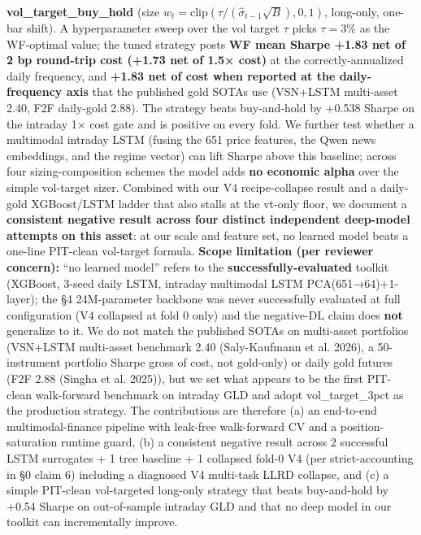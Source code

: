 \documentclass[
]{article}
\begin{document}
\textbf{vol\_target\_buy\_hold} (size \(w_t = \mathrm{clip}(\tau /
(\hat{\sigma}_{t-1}\sqrt{B}), 0, 1)\), long-only, one-bar shift). A
hyperparameter sweep over the vol target \(\tau\) picks \(\tau = 3\%\)
as the WF-optimal value; the tuned strategy posts \textbf{WF mean Sharpe
+1.83 net of 2 bp round-trip cost (+1.73 net of 1.5× cost)} at the
correctly-annualized daily frequency, and \textbf{+1.83 net of cost when
reported at the daily-frequency axis} that the published gold SOTAs use
(VSN+LSTM multi-asset 2.40, F2F daily-gold 2.88). The strategy beats
buy-and-hold by +0.538 Sharpe on the intraday 1× cost gate and is
positive on every fold. We further test whether a multimodal intraday
LSTM (fusing the 651 price features, the Qwen news embeddings, and the
regime vector) can lift Sharpe above this baseline; across four
sizing-composition schemes the model adds \textbf{no economic alpha}
over the simple vol-target sizer. Combined with our V4 recipe-collapse
result and a daily-gold XGBoost/LSTM ladder that also stalls at the
vt-only floor, we document a \textbf{consistent negative result across
four distinct independent deep-model attempts on this asset}: at our
scale and feature set, no learned model beats a one-line PIT-clean
vol-target formula. \textbf{Scope limitation (per reviewer concern):}
``no learned model'' refers to the \textbf{successfully-evaluated}
toolkit (XGBoost, 3-seed daily LSTM, intraday multimodal LSTM
PCA(651→64)+1-layer); the §4 24M-parameter backbone was never
successfully evaluated at full configuration (V4 collapsed at fold 0
only) and the negative-DL claim does \textbf{not} generalize to it. We
do not match the published SOTAs on multi-asset portfolios (VSN+LSTM
multi-asset benchmark 2.40 (Saly-Kaufmann et al. 2026), a 50-instrument
portfolio Sharpe gross of cost, not gold-only) or daily gold futures
(F2F 2.88 (Singha et al. 2025)), but we set what appears to be the first
PIT-clean walk-forward benchmark on intraday GLD and adopt
vol\_target\_3pct as the production strategy. The contributions are
therefore (a) an end-to-end multimodal-finance pipeline with leak-free
walk-forward CV and a position-saturation runtime guard, (b) a
consistent negative result across 2 successful LSTM surrogates + 1 tree
baseline + 1 collapsed fold-0 V4 (per strict-accounting in §0 claim 6)
including a diagnosed V4 multi-task LLRD collapse, and (c) a simple
PIT-clean vol-targeted long-only strategy that beats buy-and-hold by
+0.54 Sharpe on out-of-sample intraday GLD and that no deep model in our
toolkit can incrementally improve.
\end{document}
